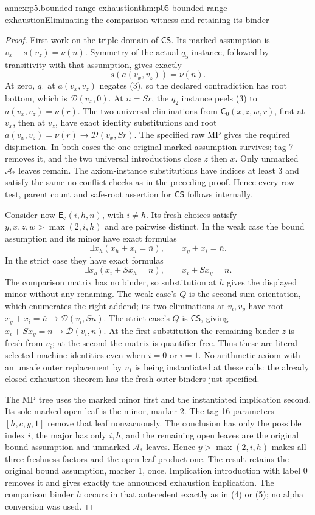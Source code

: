 \begin{annexitem}{annex:p5.bounded-range-exhaustion}{thm:p05-bounded-range-exhaustion}{Eliminating the comparison witness and retaining its binder}
\begin{proof}
First work on the triple domain of \(\mathsf{CS}\). Its marked
assumption is \(v_x+s(v_z)=\nu(n)\). Symmetry of the actual
\(q_5\) instance, followed by transitivity with that assumption,
gives exactly
\[
                       s(a(v_x,v_z))=\nu(n).
\tag{3}
\]
At zero, \(q_1\) at \(a(v_x,v_z)\) negates (3), so the declared
contradiction has root bottom, which is \(\mathcal D(v_x,0)\).
At \(n=Sr\), the \(q_2\) instance peels (3) to
\(a(v_x,v_z)=\nu(r)\). The two universal eliminations from
\(\mathsf C_0(x,z,w,r)\), first at \(v_x\), then at \(v_z\),
have exact identity substitutions and root
\(a(v_x,v_z)=\nu(r)\to\mathcal D(v_x,Sr)\).
The specified raw MP gives the required disjunction. In both cases the
one original marked assumption survives; tag 7 removes it, and the two
universal introductions close \(z\) then \(x\). Only unmarked
\(\mathcal A_*\) leaves remain. The axiom-instance substitutions
have indices at least 3 and satisfy the same no-conflict checks as in
the preceding proof. Hence every row test, parent count and safe-root
assertion for \(\mathsf{CS}\) follows internally.

Consider now \(\mathsf E_\diamond(i,h,n)\), with \(i\ne h\).
Its fresh choices satisfy \(y,x,z,w>\max(2,i,h)\) and are
pairwise distinct. In the weak case the bound assumption and its minor
have exact formulas
\[
 \exists x_h(x_h+x_i=\bar n),\qquad x_y+x_i=\bar n.
\tag{4}
\]
In the strict case they have exact formulas
\[
 \exists x_h(x_i+Sx_h=\bar n),\qquad x_i+Sx_y=\bar n.
\tag{5}
\]
The comparison matrix has no binder, so substitution at \(h\) gives
the displayed minor without any renaming. The weak case's \(Q\)
is the second sum orientation, which enumerates the right addend;
its two eliminations at \(v_i,v_y\) have root
\(x_y+x_i=\bar n\to\mathcal D(v_i,Sn)\). The strict case's
\(Q\) is \(\mathsf{CS}\), giving
\(x_i+Sx_y=\bar n\to\mathcal D(v_i,n)\).
At the first substitution the remaining binder \(z\) is fresh from
\(v_i\); at the second the matrix is quantifier-free. Thus these
are literal selected-machine identities even when \(i=0\) or
\(i=1\). No arithmetic axiom with an unsafe outer replacement by
\(v_1\) is being instantiated at these calls: the already closed
exhaustion theorem has the fresh outer binders just specified.

The MP tree uses the marked minor first and the instantiated implication
second. Its sole marked open leaf is the minor, marker 2. The tag-16
parameters \([h,c,y,1]\) remove that leaf nonvacuously. The conclusion
has only the possible index \(i\), the major has only \(i,h\), and
the remaining open leaves are the original bound assumption and unmarked
\(\mathcal A_*\) leaves. Hence \(y>\max(2,i,h)\) makes all three
freshness factors and the open-leaf product one. The result retains the
original bound assumption, marker 1, once. Implication introduction with
label 0 removes it and gives exactly the announced exhaustion implication.
The comparison binder \(h\) occurs in that antecedent exactly as in
(4) or (5); no alpha conversion was used.


\end{proof}
\end{annexitem}
